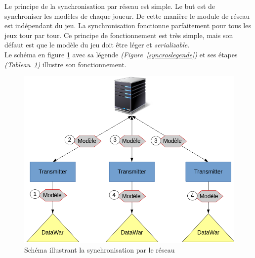 \documentclass[a4paper,11pt]{report}
\begin{document}
  Le principe de la synchronisation par réseau est simple. Le but est de synchroniser les modèles de chaque joueur. De cette manière le module de réseau est indépendant du jeu. La synchronisation fonctionne parfaitement pour tous les jeux tour par tour. Ce principe de fonctionnement est très simple, mais son défaut est que le modèle du jeu doit être léger et \textit{serializable}.
\\
Le schéma en figure \ref{syncros} avec sa légende \textit{(Figure~\ref{syncroslegende})} et ses étapes \textit{(Tableau~\ref{syncros})} illustre son fonctionnement.
  \begin{figure}[th]
      \begin{center}
        \includegraphics[scale=0.4]{Assets/s_r_2.png}
        \caption{Schéma illustrant la synchronisation par le réseau}
        \label{syncros}
      \end{center}
  \end{figure}
  
\end{document}
